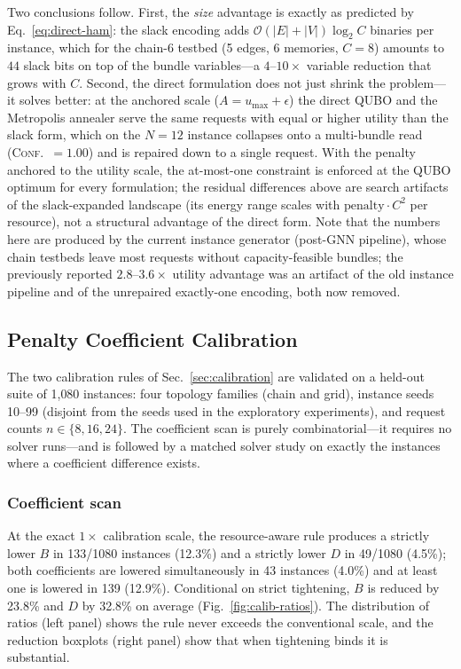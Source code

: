 \documentclass[10pt,a4paper]{article}
\begin{document}
Two conclusions follow.  First, the \emph{size} advantage is exactly
as predicted by Eq.~\eqref{eq:direct-ham}: the slack encoding adds
$\mathcal{O}(|E|+|V|)\log_2 C$ binaries per instance, which for the
chain-$6$ testbed (5 edges, 6 memories, $C{=}8$) amounts to $44$ slack
bits on top of the bundle variables---a $4$--$10\times$ variable
reduction that grows with $C$.  Second, the direct formulation does not
just shrink the problem---it solves better: at the anchored scale
($A{=}u_{\max}{+}\epsilon$) the direct QUBO and the Metropolis
annealer serve the same requests with equal or higher utility than the
slack form, which on the $N{=}12$ instance collapses onto a
multi-bundle read (\textsc{Conf.}~$= 1.00$) and is repaired down to a
single request.  With the penalty anchored to the utility scale, the
at-most-one constraint is enforced at the QUBO optimum for every
formulation; the residual differences above are search artifacts of the
slack-expanded landscape (its energy range scales with
$\mathrm{penalty}\cdot C^2$ per resource), not a structural advantage of
the direct form.  Note that the numbers here are produced by the
current instance generator (post-GNN pipeline), whose chain testbeds
leave most requests without capacity-feasible bundles; the previously
reported $2.8$--$3.6\times$ utility advantage was an artifact of the
old instance pipeline and of the unrepaired exactly-one encoding, both
now removed.

\subsection{Penalty Coefficient Calibration}
\label{sec:results-calibration}

The two calibration rules of Sec.~\ref{sec:calibration} are validated
on a held-out suite of 1{,}080 instances: four topology families
(chain and grid), instance seeds 10--99 (disjoint from the seeds used
in the exploratory experiments), and request counts
$n \in \{8, 16, 24\}$.  The coefficient scan is purely
combinatorial---it requires no solver runs---and is followed by a
matched solver study on exactly the instances where a coefficient
difference exists.

\subsubsection{Coefficient scan}

At the exact $1\times$ calibration scale, the resource-aware rule
produces a strictly lower $B$ in 133/1080 instances (12.3\%) and a
strictly lower $D$ in 49/1080 (4.5\%); both coefficients are lowered
simultaneously in 43 instances (4.0\%) and at least one is lowered in
139 (12.9\%).  Conditional on strict tightening, $B$ is reduced by
23.8\% and $D$ by 32.8\% on average (Fig.~\ref{fig:calib-ratios}).
The distribution of ratios (left panel) shows the rule never exceeds
the conventional scale, and the reduction boxplots (right panel) show
that when tightening binds it is substantial.
\end{document}
